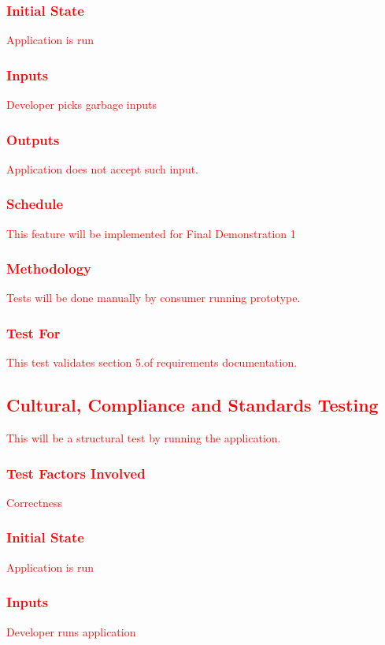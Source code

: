 \documentclass[11pt, oneside]{article}   	%
\begin{document}
\subsubsection{\textcolor{red}{Initial State}}
\textcolor{red}{Application is run}
\subsubsection{\textcolor{red}{Inputs}}
\textcolor{red}{Developer picks garbage inputs}
\subsubsection{\textcolor{red}{Outputs}}
\textcolor{red}{Application does not accept such input.}
\subsubsection{\textcolor{red}{Schedule}}
\textcolor{red}{This feature will be implemented for Final Demonstration 1}
\subsubsection{\textcolor{red}{Methodology}}
\textcolor{red}{Tests will be done manually by consumer running prototype.}
\subsubsection{\textcolor{red}{Test For}}
\textcolor{red}{This test validates section 5.of requirements documentation.}


\subsection{\textcolor{red}{Cultural, Compliance and Standards Testing}}
\textcolor{red}{This will be a structural test by running the application.}
\subsubsection{\textcolor{red}{Test Factors Involved}}
\textcolor{red}{Correctness}
\subsubsection{\textcolor{red}{Initial State}}
\textcolor{red}{Application is run}
\subsubsection{\textcolor{red}{Inputs}}
\textcolor{red}{Developer runs application}
\end{document}
